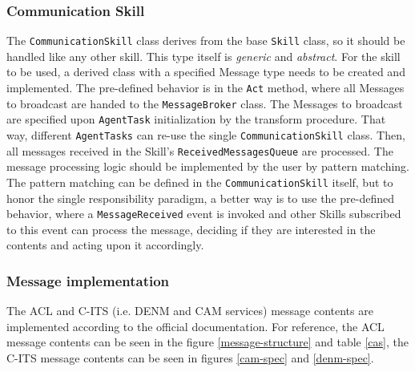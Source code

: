 \documentclass[0main.tex]{subfiles}
\begin{document}
\subsubsection{Communication Skill}

The \texttt{CommunicationSkill} class derives from the base \texttt{Skill} class, so it should
be handled like any other skill. This type itself is \emph{generic} and \emph{abstract}. For
the skill to be used, a derived class with a specified Message type needs to be created and
implemented. The pre-defined behavior is in the \texttt{Act} method, where all Messages to
broadcast are handed to the \texttt{MessageBroker} class.  The Messages to broadcast are
specified upon \texttt{AgentTask} initialization by the transform procedure. That way,
different \texttt{AgentTasks} can re-use the single \texttt{CommunicationSkill} class.  Then,
all messages received in the Skill's \texttt{ReceivedMessagesQueue} are processed. The message
processing logic should be implemented by the user by pattern matching. The pattern matching
can be defined in the \texttt{CommunicationSkill} itself, but to honor the single
responsibility paradigm, a better way is to use the pre-defined behavior, where a
\texttt{MessageReceived} event is invoked and other Skills subscribed to this event can process
the message, deciding if they are interested in the contents and acting upon it accordingly. 

\subsubsection{Message implementation}

The ACL and C-ITS (i.e. DENM and CAM services) message contents are implemented according to 
the official documentation. For reference, the ACL message contents can be seen in the figure
\ref{message-structure} and table \ref{cas}, the C-ITS message contents can be seen 
in figures \ref{cam-spec} and \ref{denm-spec}.
\end{document}
